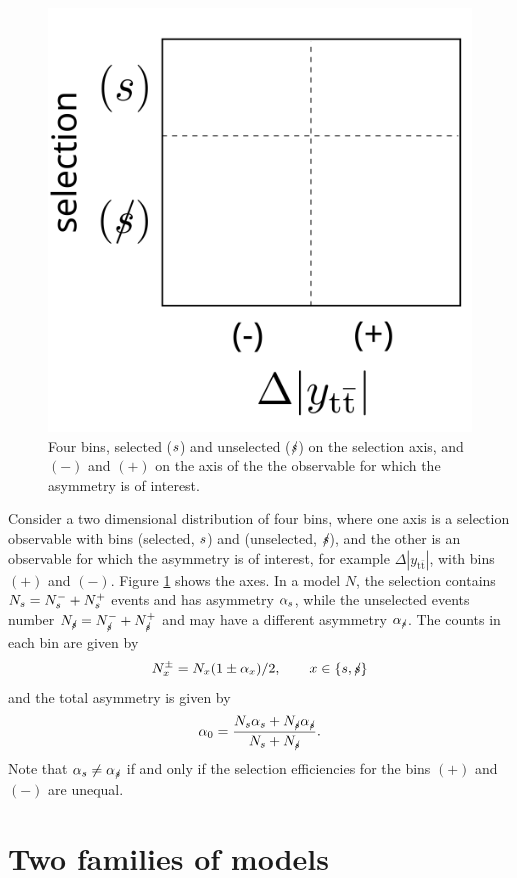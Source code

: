 \documentclass[letterpaper,11pt]{article}
\newcommand{\selected}{{\ensuremath s}}
\newcommand{\unselected}{{\ensuremath\slash\!\!\!\selected}}
\newcommand{\tot}{0}
\begin{document}
\begin{figure}
  \centering
  \includegraphics[width=0.3\linewidth]{axes}
  \caption{\label{axes} Four bins, selected ($\selected$) and unselected ($\unselected$) on
    the selection axis, and $(-)$ and $(+)$ on the axis of the the
    observable for which the asymmetry is of interest.}
\end{figure}

Consider a two dimensional distribution of four bins, where one axis
is a selection observable with bins (selected, $\selected$) and
(unselected, $\unselected$), and the other is an observable for which
the asymmetry is of interest, for example
$\Delta|y_{\mathrm{t\bar{t}}}|$, with bins $(+)$ and $(-)$.  Figure
\ref{axes} shows the axes. In a model $N$, the selection contains
$N_\selected=N_\selected^-+N_\selected^+$ events and has asymmetry
$\alpha_\selected$, while the unselected events number
$N_\unselected=N_\unselected^-+N_\unselected^+$ and may have a
different asymmetry $\alpha_\unselected$.  The counts in each bin are
given by
\[N_x^{\pm} = N_x(1\pm\alpha_x)/2,\qquad x\in\{\selected,\unselected\}\]
and the total asymmetry is given by
\[\alpha_\tot = \frac{N_\selected\alpha_\selected + N_\unselected\alpha_\unselected}{N_\selected+N_\unselected}.\]
Note that $\alpha_\selected\ne\alpha_\unselected$ if and only if the selection
efficiencies for the bins $(+)$ and $(-)$ are unequal.

\section{Two families of models}
\end{document}
